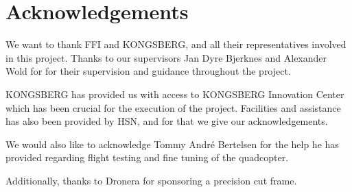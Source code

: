 
\chapter*{Acknowledgements}





We want to thank FFI and KONGSBERG, and all their representatives involved in this project. Thanks to our supervisors Jan Dyre Bjerknes and Alexander Wold for for their supervision and guidance throughout the project.\bigskip  

KONGSBERG has provided us with access to KONGSBERG Innovation Center which has been crucial for the execution of the project. Facilities and assistance has also been provided by HSN, and for that we give our acknowledgements. \bigskip

We would also like to acknowledge Tommy André Bertelsen for the help he has provided regarding flight testing and fine tuning of the quadcopter. \bigskip 

Additionally, thanks to Dronera for sponsoring a precision cut frame.\bigskip

